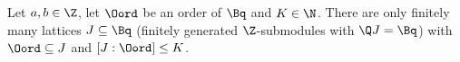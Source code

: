 Let $a,b\in\Z$, let $\Oord$ be an order of $\Bq$ and $K\in\N$. There are only finitely many lattices $J\subseteq\Bq$
(finitely generated $\Z$-submodules with $\Q J=\Bq$) with $\Oord\subseteq J$ and $[J:\Oord]\le K$.

